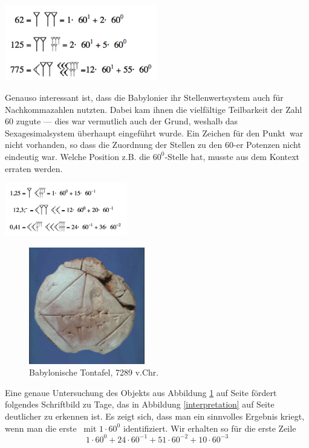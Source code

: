 \documentclass[%
11pt,%
twoside,%
titlepage,%
swissgerman,%
headsepline%
]{scrartcl}
\theoremstyle{definition}
\theoremstyle{plain}
\begin{document}
\begin{center}
\includegraphics[width=0.5\textwidth]{pictures/babylongrossezahlen}
\end{center}
Genauso interessant ist, dass die Babylonier ihr Stellenwertsystem auch für Nachkommazahlen nutzten. Dabei kam ihnen die vielfältige Teilbarkeit der Zahl 60 zugute --- dies war vermutlich auch der Grund, weshalb das Sexagesimalsystem überhaupt eingeführt wurde. Ein Zeichen für den \glqq Punkt\grqq\ war nicht vorhanden, so dass die Zuordnung der Stellen zu den $60$-er Potenzen nicht eindeutig war. Welche Position z.B. die $60^0$-Stelle hat, musste aus dem Kontext erraten werden.
\begin{center}
\includegraphics[width=0.4\textwidth]{pictures/babylonnachkomma}
\end{center}

\begin{figure}
\begin{center}
\includegraphics[width=0.45\textwidth]{pictures/tontafel}
\end{center}
\caption{Babylonische Tontafel, 7289 v.Chr.}\label{abb:tontafel}
\end{figure}

Eine genaue Untersuchung des Objekts aus Abbildung \ref{abb:tontafel} auf Seite \pageref{abb:tontafel} fördert folgendes Schriftbild zu Tage, das in Abbildung \ref{interpretation} auf Seite \pageref{interpretation} deutlicher zu erkennen ist. Es zeigt sich, dass man ein sinnvolles Ergebnis kriegt, wenn man die erste \grqq\ mit $1\cdot60^0$ identifiziert. Wir erhalten so für die erste Zeile
$$1\cdot60^0+24\cdot60^{-1}+51\cdot60^{-2}+10\cdot60^{-3}$$
\end{document}
